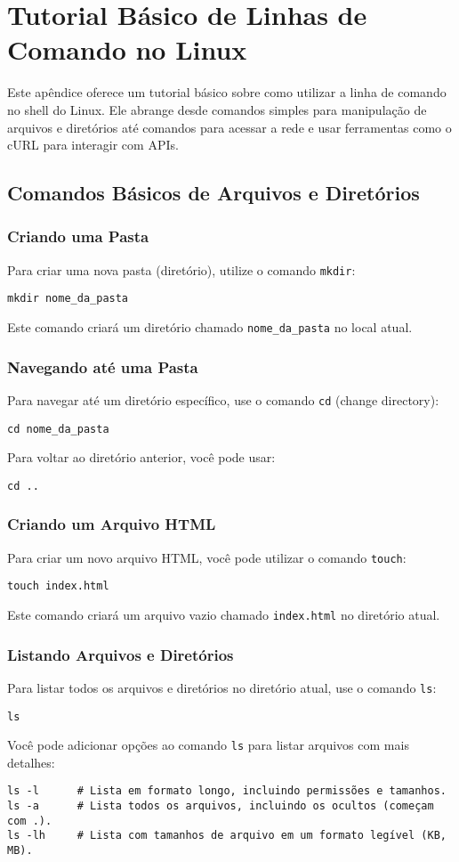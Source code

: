 \chapter{Tutorial Básico de Linhas de Comando no Linux}

Este apêndice oferece um tutorial básico sobre como utilizar a linha de comando no shell do Linux. Ele abrange desde comandos simples para manipulação de arquivos e diretórios até comandos para acessar a rede e usar ferramentas como o cURL para interagir com APIs.

\section{Comandos Básicos de Arquivos e Diretórios}

\subsection{Criando uma Pasta}
Para criar uma nova pasta (diretório), utilize o comando \texttt{mkdir}:
\begin{verbatim}
mkdir nome_da_pasta
\end{verbatim}
Este comando criará um diretório chamado \texttt{nome\_da\_pasta} no local atual.

\subsection{Navegando até uma Pasta}
Para navegar até um diretório específico, use o comando \texttt{cd} (change directory):
\begin{verbatim}
cd nome_da_pasta
\end{verbatim}
Para voltar ao diretório anterior, você pode usar:
\begin{verbatim}
cd ..
\end{verbatim}

\subsection{Criando um Arquivo HTML}
Para criar um novo arquivo HTML, você pode utilizar o comando \texttt{touch}:
\begin{verbatim}
touch index.html
\end{verbatim}
Este comando criará um arquivo vazio chamado \texttt{index.html} no diretório atual.

\subsection{Listando Arquivos e Diretórios}
Para listar todos os arquivos e diretórios no diretório atual, use o comando \texttt{ls}:
\begin{verbatim}
ls
\end{verbatim}
Você pode adicionar opções ao comando \texttt{ls} para listar arquivos com mais detalhes:
\begin{verbatim}
ls -l      # Lista em formato longo, incluindo permissões e tamanhos.
ls -a      # Lista todos os arquivos, incluindo os ocultos (começam com .).
ls -lh     # Lista com tamanhos de arquivo em um formato legível (KB, MB).
\end{verbatim}

